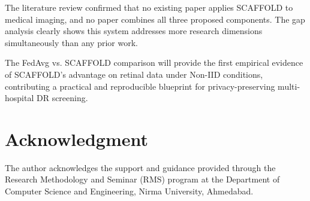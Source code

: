 \documentclass[12pt, a4paper]{article}
\begin{document}
The literature review confirmed that no existing paper applies SCAFFOLD to medical imaging, and no paper combines all three proposed components. The gap analysis clearly shows this system addresses more research dimensions simultaneously than any prior work.

The FedAvg vs. SCAFFOLD comparison will provide the first empirical evidence of SCAFFOLD's advantage on retinal data under Non-IID conditions, contributing a practical and reproducible blueprint for privacy-preserving multi-hospital DR screening.

\section*{Acknowledgment}
The author acknowledges the support and guidance provided through the Research Methodology and Seminar (RMS) program at the Department of Computer Science and Engineering, Nirma University, Ahmedabad.
\end{document}
